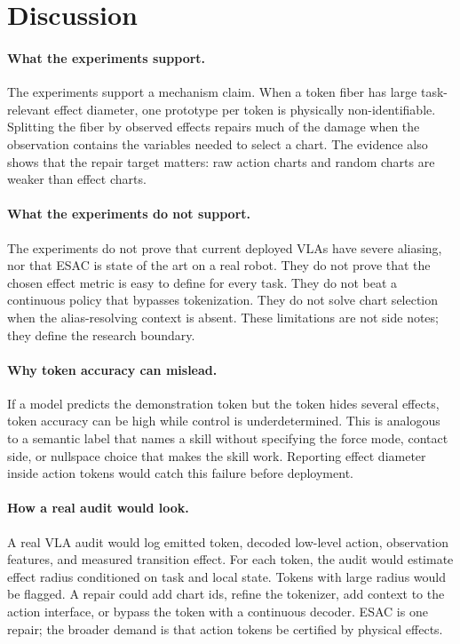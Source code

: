 \documentclass{article}
\begin{document}
\section{Discussion}

\paragraph{What the experiments support.}
The experiments support a mechanism claim. When a token fiber has large
task-relevant effect diameter, one prototype per token is physically
non-identifiable. Splitting the fiber by observed effects repairs much of the
damage when the observation contains the variables needed to select a chart.
The evidence also shows that the repair target matters: raw action charts and
random charts are weaker than effect charts.

\paragraph{What the experiments do not support.}
The experiments do not prove that current deployed VLAs have severe aliasing,
nor that ESAC is state of the art on a real robot. They do not prove that the
chosen effect metric is easy to define for every task. They do not beat a
continuous policy that bypasses tokenization. They do not solve chart selection
when the alias-resolving context is absent. These limitations are not side
notes; they define the research boundary.

\paragraph{Why token accuracy can mislead.}
If a model predicts the demonstration token but the token hides several effects,
token accuracy can be high while control is underdetermined. This is analogous
to a semantic label that names a skill without specifying the force mode,
contact side, or nullspace choice that makes the skill work. Reporting effect
diameter inside action tokens would catch this failure before deployment.

\paragraph{How a real audit would look.}
A real VLA audit would log emitted token, decoded low-level action, observation
features, and measured transition effect. For each token, the audit would
estimate effect radius conditioned on task and local state. Tokens with large
radius would be flagged. A repair could add chart ids, refine the tokenizer, add
context to the action interface, or bypass the token with a continuous decoder.
ESAC is one repair; the broader demand is that action tokens be certified by
physical effects.
\end{document}
